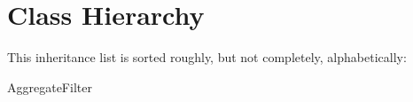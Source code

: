 \section{Class Hierarchy}
This inheritance list is sorted roughly, but not completely, alphabetically\+:\begin{DoxyCompactList}
\item Aggregate\+Filter\begin{DoxyCompactList}
\item {}
\end{DoxyCompactList}
\item {}
\end{DoxyCompactList}
